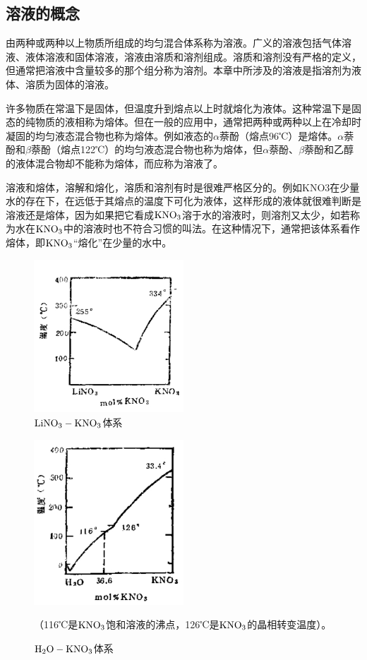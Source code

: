 ﻿\subsection{溶液的概念}

由两种或两种以上物质所组成的均匀混合体系称为溶液。广义的溶液包括气体溶液、液体溶液和固体溶液，溶液由溶质和溶剂组成。溶质和溶剂没有严格的定义，但通常把溶液中含量较多的那个组分称为溶剂。本章中所涉及的溶液是指溶剂为液体、溶质为固体的溶液。

许多物质在常温下是固体，但温度升到熔点以上时就熔化为液体。这种常温下是固态的纯物质的液相称为熔体。但在一般的应用中，通常把两种或两种以上在冷却时凝固的均匀液态混合物也称为熔体。例如液态的$\alpha$萘酚（熔点96℃）是熔体。$\alpha$萘酚和$\beta$萘酚（熔点122℃）的均匀液态混合物也称为熔体，但$\alpha$萘酚、$\beta$萘酚和乙醇的液体混合物却不能称为熔体，而应称为溶液了。

溶液和熔体，溶解和熔化，溶质和溶剂有时是很难严格区分的。例如KNO3在少量水的存在下，在远低于其熔点的温度下可化为液体，这样形成的液体就很难判断是溶液还是熔体，因为如果把它看成$\rm KNO_3$溶于水的溶液时，则溶剂又太少，如若称为水在$\rm KNO_3$中的溶液时也不符合习惯的叫法。在这种情况下，通常把该体系看作熔体，即$\rm KNO_3$“熔化”在少量的水中。

\begin{figure}[thpb]
 \centering
 \includegraphics[width=0.5\textwidth]{fig/cp03/img3.1.jpg}
 \caption{$\rm LiNO_3-KNO_3$体系}
\end{figure}

\begin{figure}[thpb]
 \centering
 \includegraphics[width=0.5\textwidth]{fig/cp03/img3.2.jpg}
 \caption{$\rm H_2O-KNO_3$体系}
 （116℃是$\rm KNO_3$饱和溶液的沸点，126℃是$\rm KNO_3$的晶相转变温度）。
\end{figure}

